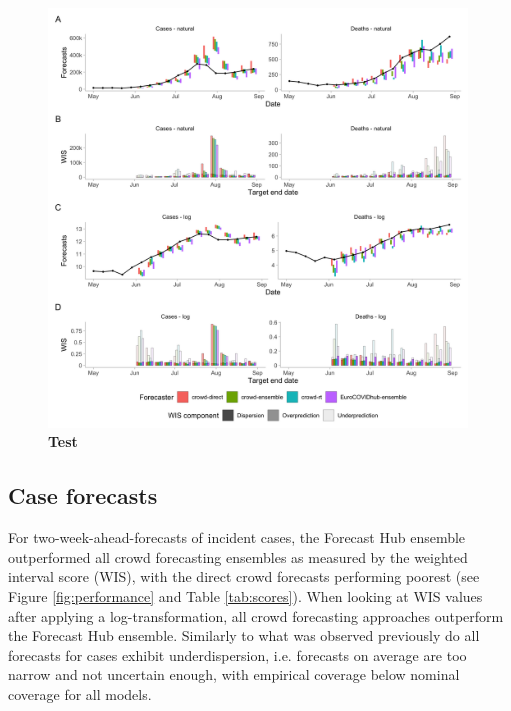 \documentclass[10pt,a4paper,twocolumn]{article}
\begin{document}

\begin{figure}[H]
\centering
\includegraphics[width=0.99\textwidth]{../output/figures/scores-and-forecasts.png}
\caption{\bf{Test}}
\label{fig:forecasts-scores}
\end{figure}

\subsection*{Case forecasts}

For two-week-ahead-forecasts of incident cases, the Forecast Hub ensemble outperformed all crowd forecasting ensembles as measured by the weighted interval score (WIS), with the direct crowd forecasts performing poorest (see Figure \ref{fig:performance} and Table \ref{tab:scores}). When looking at WIS values after applying a log-transformation, all crowd forecasting approaches outperform the Forecast Hub ensemble. Similarly to what was observed previously \citep{bosseComparingHumanModelbased2022, KATH} do all forecasts for cases exhibit underdispersion, i.e. forecasts on average are too narrow and not uncertain enough, with empirical coverage below nominal coverage for all models. 
\end{document}
